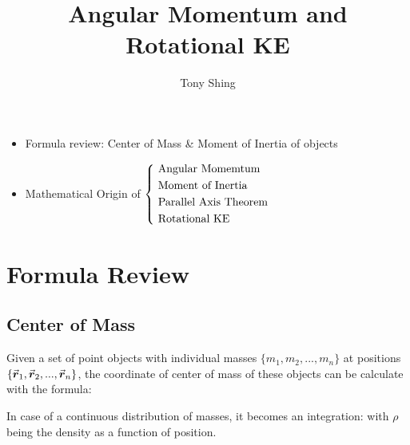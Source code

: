 \documentclass[class=article, crop=false, 12pt]{standalone}
\author{Tony Shing}
\title{Angular Momentum and Rotational KE}
\begin{document}
\maketitle


\begin{overview}
    \begin{itemize}
        \item Formula review: Center of Mass \& Moment of Inertia of objects
        \item Mathematical Origin of 
        $\left\{ \ \begin{aligned} 
            &\text{Angular Momemtum} \\ 
            &\text{Moment of Inertia} \\ 
            &\text{Parallel Axis Theorem}\\
            &\text{Rotational KE}
         \end{aligned}\right.$
    \end{itemize}
\end{overview}



\section{Formula Review}

\subsection{Center of Mass}
Given a set of point objects with individual masses $\{m_1, m_2, ..., m_n\}$ at positions $\{\va*{r}_1, \va*{r}_2, ..., \va*{r}_n\}$,
the coordinate of center of mass of these objects can be calculate with the formula:

In case of a continuous distribution of masses, it becomes an integration:
with $\rho$ being the density as a function of position.
\end{document}
